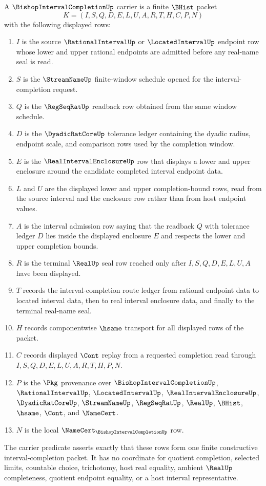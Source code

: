 \begin{definition}
\label{def:bishop-interval-completion-carrier}
A $\BishopIntervalCompletionUp$ carrier is a finite $\BHist$ packet
$$
K=(I,S,Q,D,E,L,U,A,R,T,H,C,P,N)
$$
with the following displayed rows:
\begin{enumerate}
\item $I$ is the source $\RationalIntervalUp$ or $\LocatedIntervalUp$ endpoint row whose lower and upper rational endpoints are admitted before any real-name seal is read.
\item $S$ is the $\StreamNameUp$ finite-window schedule opened for the interval-completion request.
\item $Q$ is the $\RegSeqRatUp$ readback row obtained from the same window schedule.
\item $D$ is the $\DyadicRatCoreUp$ tolerance ledger containing the dyadic radius, endpoint scale, and comparison rows used by the completion window.
\item $E$ is the $\RealIntervalEnclosureUp$ row that displays a lower and upper enclosure around the candidate completed interval endpoint data.
\item $L$ and $U$ are the displayed lower and upper completion-bound rows, read from the source interval and the enclosure row rather than from host endpoint values.
\item $A$ is the interval admission row saying that the readback $Q$ with tolerance ledger $D$ lies inside the displayed enclosure $E$ and respects the lower and upper completion bounds.
\item $R$ is the terminal $\RealUp$ seal row reached only after $I,S,Q,D,E,L,U,A$ have been displayed.
\item $T$ records the interval-completion route ledger from rational endpoint data to located interval data, then to real interval enclosure data, and finally to the terminal real-name seal.
\item $H$ records componentwise $\hsame$ transport for all displayed rows of the packet.
\item $C$ records displayed $\Cont$ replay from a requested completion read through $I,S,Q,D,E,L,U,A,R,T,H,P,N$.
\item $P$ is the $\Pkg$ provenance over $\BishopIntervalCompletionUp$, $\RationalIntervalUp$, $\LocatedIntervalUp$, $\RealIntervalEnclosureUp$, $\DyadicRatCoreUp$, $\StreamNameUp$, $\RegSeqRatUp$, $\RealUp$, $\BHist$, $\hsame$, $\Cont$, and $\NameCert$.
\item $N$ is the local $\NameCert_{\BishopIntervalCompletionUp}$ row.
\end{enumerate}
The carrier predicate asserts exactly that these rows form one finite constructive interval-completion packet. It has no coordinate for quotient completion, selected limits, countable choice, trichotomy, host real equality, ambient $\RealUp$ completeness, quotient endpoint equality, or a host interval representative.
\end{definition}

